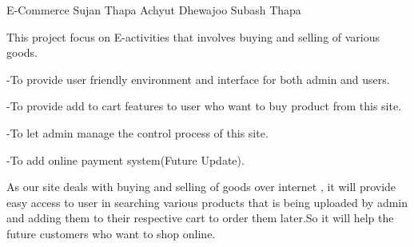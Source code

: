  \begin{conf-abstract}[]
 {E-Commerce}
 {Sujan Thapa
 	Achyut Dhewajoo
 	Subash Thapa
 }
{}

This project focus on E-activities that involves buying and selling of various goods.

-To provide user friendly environment and interface for both admin and users.

-To provide add to cart features to user who want to buy product from this site.

-To let admin manage the control process of this site.

-To add online payment system(Future Update).

As our site deals with buying and selling of goods over internet , it will provide easy access to user in searching various products that is being uploaded by admin and adding them to their respective cart to order them later.So it will help the future customers who want to shop online.

 \end{conf-abstract}